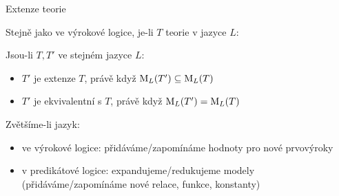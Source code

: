 \documentclass{beamer}
\begin{document}
\begin{frame}{Extenze teorie}

    Stejně jako ve výrokové logice, je-li $T$ teorie v jazyce $L$:\pause 

    
    Jsou-li $T,T'$ ve stejném jazyce $L$:\pause 
    \begin{itemize}
        \item $T'$ je extenze $T$, právě když $\operatorname{M}_L(T')\subseteq\operatorname{M}_L(T)$\pause 
        \item $T'$ je ekvivalentní s $T$, právě když $\operatorname{M}_L(T')=\operatorname{M}_L(T)$\pause 
    \end{itemize}
       
    Zvětšíme-li jazyk:\pause 
    \begin{itemize}
        \item \alert{ve výrokové logice:} přidáváme/zapomínáme hodnoty pro nové prvovýroky\pause 
        \item \alert{v predikátové logice:} expandujeme/redukujeme modely (přidáváme/zapomínáme nové relace, funkce, konstanty)
    \end{itemize}

\end{frame}
\end{document}
